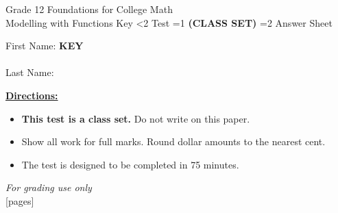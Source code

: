 \documentclass[addpoints]{exam}
\newcommand{\event}{Modelling with Functions}
\newcommand{\tournament}{}
\def\type{0}
\begin{document}
\begin{center}
    {\huge Grade 12 Foundations for College Math \\ \event
    \ifprintanswers \space Key
    \else \space \ifnum\type<2 Test \fi \ifnum\type=1 \textbf{(CLASS SET)} \fi
          \ifnum\type=2 Answer Sheet \fi
    \fi \\ \vspace{3mm}\tournament\vspace{1mm}}
\end{center}

\vspace{.25\textheight}

\begin{center}
    First Name: \ifprintanswers
    \underline{\hspace{3.5cm}}\textbf{KEY}\underline{\hspace{5.5cm}}\\\ \vspace{5mm}
    \else \underline{\hspace{10cm}}\\ \vspace{5mm} \fi
    Last Name: \underline{\hspace{10cm}}\\ \vspace{5mm}
\end{center}

\noindent\textbf{\underline{Directions:}}
\begin{itemize}
    \ifnum\type=1 \item \textbf{This test is a class set.} Do not write on this paper. \fi
    \item Show all work for full marks. Round dollar amounts to the nearest cent.
    \item The test is designed to be completed in 75 minutes.
\end{itemize}
\begin{center}
\textit{For grading use only}\\
[pages]
\end{center}
\end{document}
